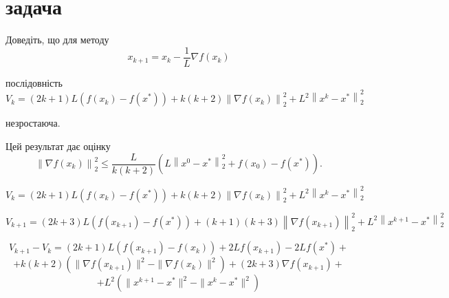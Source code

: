 
\section{задача}

\begin{tcolorbox}[title=Умова]
    Доведіть, що для методу
    $$
    x_{k+1}=x_k-\frac{1}{L} \nabla f\left(x_k\right)
    $$

    послідовність
    $$
    V_k=(2 k+1) L\left(f\left(x_k\right)-f\left(x^*\right)\right)+k(k+2)\left\|\nabla f\left(x_k\right)\right\|_2^2+L^2\left\|x^k-x^*\right\|_2^2
    $$

    незростаюча.

    Цей результат дає оцінку
    $$
    \left\|\nabla f\left(x_k\right)\right\|_2^2 \leq \frac{L}{k(k+2)}\left(L\left\|x^0-x^*\right\|_2^2+f\left(x_0\right)-f\left(x^*\right)\right) .
    $$
\end{tcolorbox}


$$
V_k=(2 k+1) L\left(f\left(x_k\right)-f\left(x^*\right)\right)+k(k+2)\left\|\nabla f\left(x_k\right)\right\|_2^2+L^2\left\|x^k-x^*\right\|_2^2
$$

$$
V_{k+1}=(2 k+3) L\left(f\left(x_{k+1}\right)-f\left(x^*\right)\right)+(k + 1)(k+3)\left\|\nabla f\left(x_{k+1}\right)\right\|_2^2+L^2\left\|x^{k+1}-x^*\right\|_2^2
$$

$$
V_{k+1} - V_{k} = (2k+1)L(f(x_{k+1}) - f(x_k)) + 2Lf(x_{k+1}) - 2Lf(x^*) +$$ 
$$+k(k+2)(\|\nabla f(x_{k+1})\|^2 -  \|\nabla f(x_k)\|^2) + (2k + 3)\nabla f(x_{k+1}) + $$
$$+L^2(\|x^{k+1} - x^*\|^2 - \|x^k - x^*\|^2)
$$

